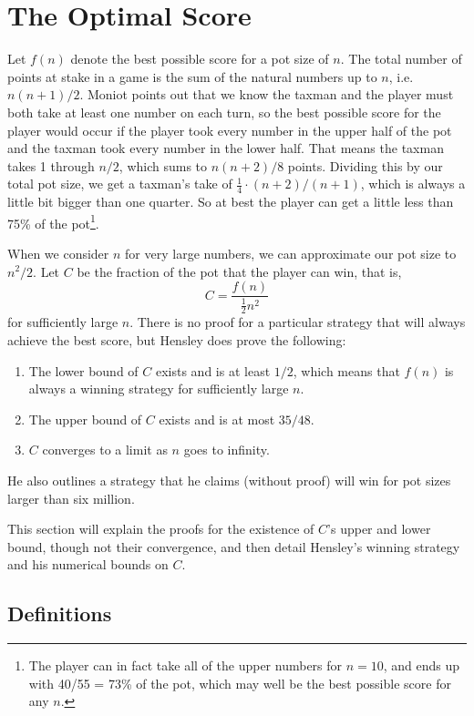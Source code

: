 \documentclass[a4paper,10pt]{amsart} %
\begin{document}
\section{The Optimal Score} \label{hensley}

Let $f(n)$ denote the best possible score for a pot size of $n$. The total number of points at stake in a game is the sum of the natural numbers up to $n$, i.e. $n(n+1)/2$. Moniot points out that we know the taxman and the player must both take at least one number on each turn, so the best possible score for the player would occur if the player took every number in the upper half of the pot and the taxman took every number in the lower half. That means the taxman takes 1 through $n/2$, which sums to $n(n+2)/8$ points. Dividing this by our total pot size, we get a taxman's take of $\frac{1}{4} \cdot (n+2) / (n+1)$, which is always a little bit bigger than one quarter. So at best the player can get a little less than 75\% of the pot\footnote{The player can in fact take all of the upper numbers for $n = 10$, and ends up with 40/55 = 73\% of the pot, which may well be the best possible score for any $n$.}. 


When we consider $n$ for very large numbers, we can approximate our pot size to $n^2/2$. Let $C$ be the fraction of the pot that the player can win, that is,
\begin{equation*}
    C = \frac{f(n)}{\frac{1}{2} n^2}
\end{equation*}
for sufficiently large $n$. There is no proof for a particular strategy that will always achieve the best score, but Hensley does prove the following:
\begin{enumerate}
    \item The lower bound of $C$ exists and is at least $1/2$, which means that $f(n)$ is always a winning strategy for sufficiently large $n$. 
    \item The upper bound of $C$ exists and is at most $35/48$. 
    \item $C$ converges to a limit as $n$ goes to infinity. 
\end{enumerate}
He also outlines a strategy that he claims (without proof) will win for pot sizes larger than six million.

This section will explain the proofs for the existence of $C$'s upper and lower bound, though not their convergence, and then detail Hensley's winning strategy and his numerical bounds on $C$. 

\subsection{Definitions} \label{definitions}
\end{document}
